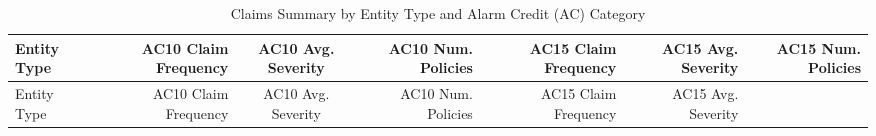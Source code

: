 \documentclass[]{book}
\theoremstyle{definition}
\theoremstyle{definition}
\theoremstyle{definition}
\theoremstyle{remark}
\begin{document}
\begin{longtable}[]{@{}lrcrrrr@{}}
\caption{Claims Summary by Entity Type and Alarm Credit (AC)
Category}\tabularnewline
\toprule
\begin{minipage}[b]{0.10\columnwidth}\raggedright\strut
Entity Type\strut
\end{minipage} & \begin{minipage}[b]{0.12\columnwidth}\raggedleft\strut
AC10 Claim Frequency\strut
\end{minipage} & \begin{minipage}[b]{0.11\columnwidth}\centering\strut
AC10 Avg. Severity\strut
\end{minipage} & \begin{minipage}[b]{0.11\columnwidth}\raggedleft\strut
AC10 Num. Policies\strut
\end{minipage} & \begin{minipage}[b]{0.12\columnwidth}\raggedleft\strut
AC15 Claim Frequency\strut
\end{minipage} & \begin{minipage}[b]{0.11\columnwidth}\raggedleft\strut
AC15 Avg. Severity\strut
\end{minipage} & \begin{minipage}[b]{0.11\columnwidth}\raggedleft\strut
AC15 Num. Policies\strut
\end{minipage}\tabularnewline
\midrule
\endfirsthead
\toprule
\begin{minipage}[b]{0.10\columnwidth}\raggedright\strut
Entity Type\strut
\end{minipage} & \begin{minipage}[b]{0.12\columnwidth}\raggedleft\strut
AC10 Claim Frequency\strut
\end{minipage} & \begin{minipage}[b]{0.11\columnwidth}\centering\strut
AC10 Avg. Severity\strut
\end{minipage} & \begin{minipage}[b]{0.11\columnwidth}\raggedleft\strut
AC10 Num. Policies\strut
\end{minipage} & \begin{minipage}[b]{0.12\columnwidth}\raggedleft\strut
AC15 Claim Frequency\strut
\end{minipage} & \begin{minipage}[b]{0.11\columnwidth}\raggedleft\strut
AC15 Avg. Severity\strut
\end{minipage} & \begin{minipage}[b]{0.11\columnwidth}\raggedleft\strut

\end{minipage}
\end{longtable}
\end{document}
